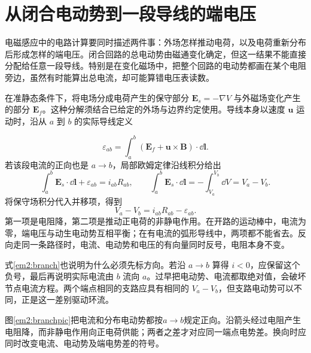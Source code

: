\section{从闭合电动势到一段导线的端电压}

电磁感应中的电路计算要同时描述两件事：外场怎样推动电荷，以及电荷重新分布后形成怎样的端电压。闭合回路的总电动势由磁通变化确定，但这一结果不能直接分配给任意一段导线。特别是在变化磁场中，把整个回路的电动势都画在某个电阻旁边，虽然有时能算出总电流，却可能算错电压表读数。


在准静态条件下，将电场分成电荷产生的保守部分 $\bm E_s=-\nabla V$ 与外磁场变化产生的部分 $\bm E_f$。这种分解须结合已给定的外场与边界约定使用。导线本身以速度 $\bm u$ 运动时，沿从 $a$ 到 $b$ 的实际导线定义

\[\varepsilon_{ab}=\int_a^b(\bm E_f+\bm u\times\bm B)\cdot\dd\bm l.\]
若该段电流的正向也是 $a\to b$，局部欧姆定律沿线积分给出
\[
 \int_a^b\bm E_s\cdot\dd\bm l+\varepsilon_{ab}=i_{ab}R_{ab},
 \qquad
 \int_a^b\bm E_s\cdot\dd\bm l=-\int_{V_a}^{V_b}\dd V=V_a-V_b.
\]
将保守场积分代入并移项，得到
\begin{equation}V_a-V_b=i_{ab}R_{ab}-\varepsilon_{ab}.\label{em2:branch}\end{equation}
第一项是电阻降，第二项是推动正电荷的非静电作用。在开路的运动棒中，电流为零，端电压与动生电动势互相平衡；在有电流的弧形导线中，两项都不能省去。反向走同一条路径时，电流、电动势和电压的有向量同时反号，电阻本身不变。


式\eqref{em2:branch}也说明为什么必须先标方向。若沿 $a\to b$ 算得 $i<0$，应保留这个负号，最后再说明实际电流由 $b$ 流向 $a$。过早把电动势、电流都取绝对值，会破坏节点电流方程。两个端点相同的支路应具有相同的 $V_a-V_b$，但支路电动势可以不同，正是这一差别驱动环流。


图\ref{em2:branchpic}把电流和分布电动势都按$a\to b$规定正向。沿箭头经过电阻产生电阻降，而非静电作用向正电荷供能；两者之差才对应同一端点电势差。换向时应同时改变电流、电动势及端电势差的符号。




